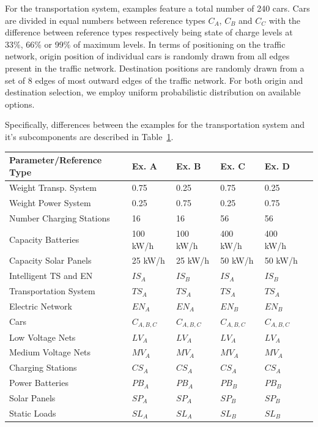 For the transportation system, examples feature a total number of 240 cars. Cars are divided in equal numbers between reference types $C_{A}$, $C_{B}$ and $C_{C}$ with the difference between reference types respectively being state of charge levels at 33\%, 66\% or 99\% of maximum levels. In terms of positioning on the traffic network, origin position of individual cars is randomly drawn from all edges present in the traffic network. Destination positions are randomly drawn from a set of 8 edges of most outward edges of the traffic network. For both origin and destination selection, we employ uniform probabilistic distribution on available options. 

Specifically, differences between the examples for the transportation system and it's subcomponents are described in Table~\ref{tab:example1}. 

\begin{table}[h]
	\renewcommand{\arraystretch}{1.3}
	\label{tab:example1}
	\centering
	\begin{tabular}{llllll}
		\hline
		\textbf{Parameter/Reference Type}                    & \textbf{Ex. A}    & \textbf{Ex. B} & \textbf{Ex. C} & \textbf{Ex. D}\\ \hline
		Weight Transp. System 			& 0.75	      & 0.25  	& 0.75	& 0.25\\
		Weight Power System 			& 0.25	      & 0.75  	& 0.25	& 0.75\\
		Number Charging Stations              & 16         & 16 		& 56	& 56\\
		Capacity Batteries          & 100 kW/h         & 100 kW/h 		& 400 kW/h		& 400 kW/h\\
		Capacity Solar Panels               & 25 kW/h         & 25 kW/h 		& 50 kW/h		& 50 kW/h	\\ \hline
		Intelligent TS and EN                 & $IS_{A}$         & $IS_{B}$ 		& $IS_{A}$		& $IS_{B}$	\\ 
		Transportation System                 & $TS_{A}$         & $TS_{A}$ 		& $TS_{A}$		& $TS_{A}$	\\ 
		Electric Network                & $EN_{A}$         & $EN_{A}$ 		& $EN_{B}$		& $EN_{B}$	\\ 
		Cars                  & $C_{A,B,C}$          & $C_{A,B,C}$		& $C_{A,B,C}$		& $C_{A,B,C}$	\\ 
		Low Voltage Nets                 & $LV_{A}$         & $LV_{A}$ 		& $LV_{A}$		& $LV_{A}$	\\ 
		Medium Voltage Nets                 & $MV_{A}$         & $MV_{A}$ 		& $MV_{A}$		& $MV_{A}$	\\ 
		Charging Stations                 & $CS_{A}$         & $CS_{A}$ 		& $CS_{A}$		& $CS_{A}$	\\ 
		Power Batteries                & $PB_{A}$         & $PB_{A}$ 		& $PB_{B}$		& $PB_{B}$	\\ 
		Solar Panels                 & $SP_{A}$         & $SP_{A}$ 		& $SP_{B}$		& $SP_{B}$	\\ 
		Static Loads                 & $SL_{A}$         & $SL_{A}$ 		& $SL_{B}$		& $SL_{B}$	\\ \hline
	\end{tabular}
\end{table}

